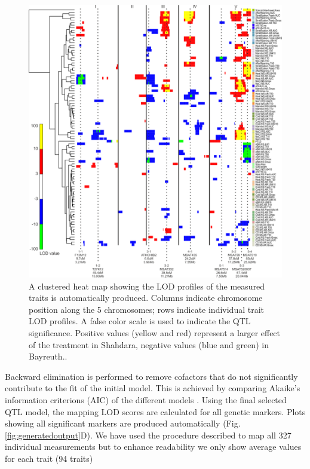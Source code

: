 \begin{figure}[h!]
  \centering
  \includegraphics[keepaspectratio,scale=0.30]{eps/image_3_1_4.eps}
  \caption[QTL locations.]{A clustered heat map showing the LOD profiles of the measured traits is automatically 
          produced. Columns indicate chromosome position along the 5 chromosomes; rows indicate individual trait 
          LOD profiles. A false color scale is used to indicate the QTL significance. Positive values (yellow and red) 
          represent a larger effect of the treatment in Shahdara, negative values (blue and green) in Bayreuth..}
\end{figure}

Backward elimination is performed to remove cofactors that do not significantly contribute to the fit 
of the initial model. This is achieved by comparing Akaike's information criterions (AIC) of the 
different models \cite{Jansen:1993}. Using the final selected QTL model, the mapping LOD scores are 
calculated for all genetic markers. Plots showing all significant markers are produced automatically 
(Fig. \ref{fig:generatedoutput}D). We have used the procedure described to map all 327 individual measurements but to enhance
readability we only show average values for each trait (94 traits)

